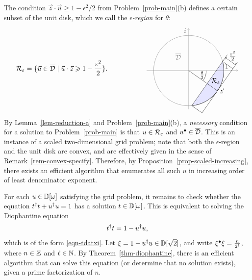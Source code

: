 \documentclass{article}
\begin{document}
The condition $\vec z\cdot \vec u \geq 1 - \epsilon^2/2$ from
Problem~\ref{prob-main}(b) defines a certain subset of the unit disk,
which we call the {\em $\epsilon$-region} for $\theta$:
\begin{equation}\label{eqn-eps-region}
  \Repsilon = \s{\vec u\in\Disk \mid \vec u\cdot \vec z\geq 1 -
    \frac{\epsilon^2}{2}}.
\hspace{2cm}
\begin{tikzpicture}[scale=1.8, baseline=0]
  \fill[fill=blue!10, yscale=-1, rotate=35] (cos 50, sin 50) -- (cos 50, -sin 50) arc (-50:50:1) -- cycle;
  \path[color=gray] (-.3,.4) node {$\Disk$};
  \draw[color=gray,->] (-1.2,0) -- (1.4,0);
  \draw[color=gray,->] (0,-1.1) -- (0,1.2);
  \path[color=gray] (0,1) node[above left] {$i$};
  \path[color=gray] (1,0) node[above=6pt,right=-2pt] {$1$};
  \draw[color=gray] (0,0) circle (1);
  \draw[yscale=-1, rotate=35] (cos 50, -sin 50) arc (-50:50:1);
  \draw[->, yscale=-1, rotate=35] (0,0) -- (1,0) node[right] {$\vec z$};
  \draw[yscale=-1, rotate=35] (cos 50, sin 50) -- (cos 50,-1);
  \draw[yscale=-1, rotate=35] (1,sin 50) -- (1,-1);
  \draw[yscale=-1, rotate=35] (cos 50, sin 50) -- (1, sin 50);
  \draw[yscale=-1, rotate=35] (cos 50, -sin 50) -- (1, -sin 50);
  \draw[<->, yscale=-1, rotate=35] (cos 50,-0.9) -- (1,-0.9);
  \draw[yscale=-1, rotate=35] (0.9, -0.9) node[above] {$\frac{\epsilon^2}{2}$};
  \path[yscale=-1, rotate=35] (0.8,-0.2) node {$\Repsilon$};
  \draw (0.5,0) arc (0:-35:0.5);
  \path (-17.5:0.4) node {\small $\frac{\theta}{2}$};
\end{tikzpicture}
\end{equation}
By Lemma~\ref{lem-reduction-a} and Problem~\ref{prob-main}(b), a {\em
  necessary} condition for a solution to Problem~\ref{prob-main} is
that $u\in{\cal R}_{\varepsilon}$ and ${u}^{\bullet}\in\overline {\cal D}$. This is an instance of a
scaled two-dimensional grid problem; note that both the
$\epsilon$-region and the unit disk are convex, and are effectively
given in the sense of Remark~\ref{rem-convex-specify}. Therefore, by
Proposition~\ref{prop-scaled-increasing}, there exists an efficient
algorithm that enumerates all such $u$ in increasing order of least
denominator exponent.

For each $u\in{\mathbb{D}}[\omega]$ satisfying the grid problem, it remains to
check whether the equation ${t}^{\dagger} t+{u}^{\dagger} u=1$ has a solution
$t\in{\mathbb{D}}[\omega]$. This is equivalent to solving the Diophantine equation
\[ t^{\dagger} t = 1 - u^{\dagger} u,
\]
which is of the form {\eqref{eqn-tdatxi}}. Let $\xi=1 - u^{\dagger}
u\in{\mathbb{D}}[\sqrt2]$, and write $\xi^{\bullet}\xi=\frac{n}{2^\ell}$, where
$n\in\mathbb{Z}$ and $\ell\in\mathbb{N}$. By Theorem~\ref{thm-diophantine}, there is
an efficient algorithm that can solve this equation (or determine that
no solution exists), given a prime factorization of $n$.
\end{document}
